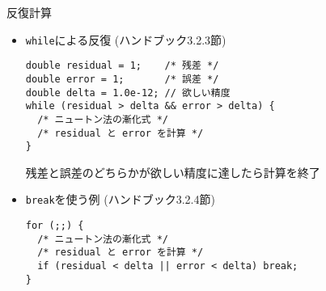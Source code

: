 \begin{frame}[t,fragile]{反復計算}
  \begin{itemize}
  \item {\tt while}による反復 (ハンドブック3.2.3節)
\begin{lstlisting}
double residual = 1;    /* 残差 */
double error = 1;       /* 誤差 */
double delta = 1.0e-12; // 欲しい精度
while (residual > delta && error > delta) {
  /* ニュートン法の漸化式 */
  /* residual と error を計算 */
}
\end{lstlisting}
残差と誤差のどちらかが欲しい精度に達したら計算を終了
\item {\tt break}を使う例 (ハンドブック3.2.4節)
\begin{lstlisting}
for (;;) {
  /* ニュートン法の漸化式 */
  /* residual と error を計算 */
  if (residual < delta || error < delta) break;
}
\end{lstlisting}
  \end{itemize}
\end{frame}
